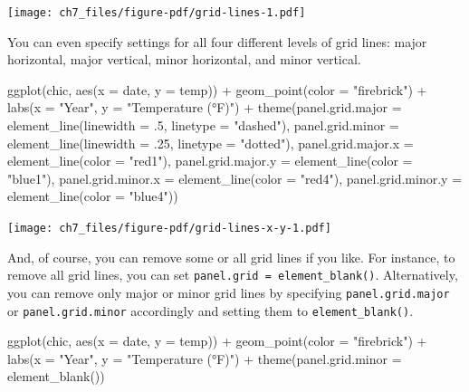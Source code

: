 \documentclass[
  letterpaper,
  DIV=11,
  numbers=noendperiod]{scrreprt}
\newenvironment{Shaded}{\begin{snugshade}}{\end{snugshade}}
\newcommand{\AttributeTok}[1]{\textcolor[rgb]{0.40,0.45,0.13}{#1}}
\newcommand{\DecValTok}[1]{\textcolor[rgb]{0.68,0.00,0.00}{#1}}
\newcommand{\FunctionTok}[1]{\textcolor[rgb]{0.28,0.35,0.67}{#1}}
\newcommand{\NormalTok}[1]{\textcolor[rgb]{0.00,0.23,0.31}{#1}}
\newcommand{\SpecialCharTok}[1]{\textcolor[rgb]{0.37,0.37,0.37}{#1}}
\newcommand{\StringTok}[1]{\textcolor[rgb]{0.13,0.47,0.30}{#1}}
\begin{document}
\texttt{[image: ch7\_files/figure-pdf/grid-lines-1.pdf]}

You can even specify settings for all four different levels of grid
lines: major horizontal, major vertical, minor horizontal, and minor
vertical.

\begin{Shaded}
\begin{Highlighting}[]
\FunctionTok{ggplot}\NormalTok{(chic, }\FunctionTok{aes}\NormalTok{(}\AttributeTok{x =}\NormalTok{ date, }\AttributeTok{y =}\NormalTok{ temp)) }\SpecialCharTok{+}
  \FunctionTok{geom\_point}\NormalTok{(}\AttributeTok{color =} \StringTok{"firebrick"}\NormalTok{) }\SpecialCharTok{+}
  \FunctionTok{labs}\NormalTok{(}\AttributeTok{x =} \StringTok{"Year"}\NormalTok{, }\AttributeTok{y =} \StringTok{"Temperature (°F)"}\NormalTok{) }\SpecialCharTok{+}
  \FunctionTok{theme}\NormalTok{(}\AttributeTok{panel.grid.major =} \FunctionTok{element\_line}\NormalTok{(}\AttributeTok{linewidth =}\NormalTok{ .}\DecValTok{5}\NormalTok{, }\AttributeTok{linetype =} \StringTok{"dashed"}\NormalTok{),}
        \AttributeTok{panel.grid.minor =} \FunctionTok{element\_line}\NormalTok{(}\AttributeTok{linewidth =}\NormalTok{ .}\DecValTok{25}\NormalTok{, }\AttributeTok{linetype =} \StringTok{"dotted"}\NormalTok{),}
        \AttributeTok{panel.grid.major.x =} \FunctionTok{element\_line}\NormalTok{(}\AttributeTok{color =} \StringTok{"red1"}\NormalTok{),}
        \AttributeTok{panel.grid.major.y =} \FunctionTok{element\_line}\NormalTok{(}\AttributeTok{color =} \StringTok{"blue1"}\NormalTok{),}
        \AttributeTok{panel.grid.minor.x =} \FunctionTok{element\_line}\NormalTok{(}\AttributeTok{color =} \StringTok{"red4"}\NormalTok{),}
        \AttributeTok{panel.grid.minor.y =} \FunctionTok{element\_line}\NormalTok{(}\AttributeTok{color =} \StringTok{"blue4"}\NormalTok{))}
\end{Highlighting}
\end{Shaded}

\texttt{[image: ch7\_files/figure-pdf/grid-lines-x-y-1.pdf]}

And, of course, you can remove some or all grid lines if you like. For
instance, to remove all grid lines, you can set
\texttt{panel.grid\ =\ element\_blank()}. Alternatively, you can remove
only major or minor grid lines by specifying \texttt{panel.grid.major}
or \texttt{panel.grid.minor} accordingly and setting them to
\texttt{element\_blank()}.

\begin{Shaded}
\begin{Highlighting}[]
\FunctionTok{ggplot}\NormalTok{(chic, }\FunctionTok{aes}\NormalTok{(}\AttributeTok{x =}\NormalTok{ date, }\AttributeTok{y =}\NormalTok{ temp)) }\SpecialCharTok{+}
  \FunctionTok{geom\_point}\NormalTok{(}\AttributeTok{color =} \StringTok{"firebrick"}\NormalTok{) }\SpecialCharTok{+}
  \FunctionTok{labs}\NormalTok{(}\AttributeTok{x =} \StringTok{"Year"}\NormalTok{, }\AttributeTok{y =} \StringTok{"Temperature (°F)"}\NormalTok{) }\SpecialCharTok{+}
  \FunctionTok{theme}\NormalTok{(}\AttributeTok{panel.grid.minor =} \FunctionTok{element\_blank}\NormalTok{())}
\end{Highlighting}
\end{Shaded}
\end{document}
